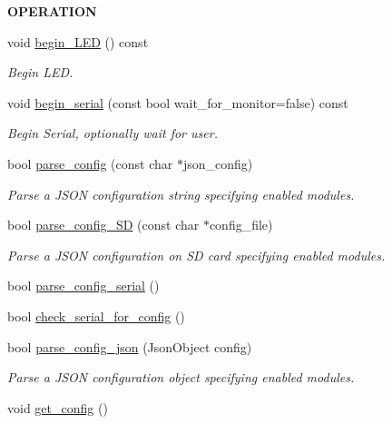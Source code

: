 \begin{Indent}{\bf O\+P\+E\+R\+A\+T\+I\+ON}\par
\begin{DoxyCompactItemize}
\item 
void \hyperlink{class_loom_manager_a315be7f7fe42feb0710b85cc8c023291}{begin\+\_\+\+L\+ED} () const 
\begin{DoxyCompactList}\small\item\em Begin L\+ED. \end{DoxyCompactList}\item 
void \hyperlink{class_loom_manager_a15a76615e56881a51a78005ad903db24}{begin\+\_\+serial} (const bool wait\+\_\+for\+\_\+monitor=false) const 
\begin{DoxyCompactList}\small\item\em Begin Serial, optionally wait for user. \end{DoxyCompactList}\item 
bool \hyperlink{class_loom_manager_ab06b9f5b623b01cc0966eb84da173238}{parse\+\_\+config} (const char $\ast$json\+\_\+config)
\begin{DoxyCompactList}\small\item\em Parse a J\+S\+ON configuration string specifying enabled modules. \end{DoxyCompactList}\item 
bool \hyperlink{class_loom_manager_adbcbf45453af8fd47dc6c536447540be}{parse\+\_\+config\+\_\+\+SD} (const char $\ast$config\+\_\+file)
\begin{DoxyCompactList}\small\item\em Parse a J\+S\+ON configuration on SD card specifying enabled modules. \end{DoxyCompactList}\item 
bool \hyperlink{class_loom_manager_a22d5a375034b484461a9488889cc348a}{parse\+\_\+config\+\_\+serial} ()
\item 
bool \hyperlink{class_loom_manager_a03b417d8a2d39954723dd33ce4856b07}{check\+\_\+serial\+\_\+for\+\_\+config} ()
\item 
bool \hyperlink{class_loom_manager_a445ca7e4c6f7db0d7dc7c5f4fa8ffea0}{parse\+\_\+config\+\_\+json} (Json\+Object config)
\begin{DoxyCompactList}\small\item\em Parse a J\+S\+ON configuration object specifying enabled modules. \end{DoxyCompactList}\item 
void \hyperlink{class_loom_manager_af9666106e7f25c4735b22c70dfaab33f}{get\+\_\+config} ()

\end{DoxyCompactItemize}
\end{Indent}
